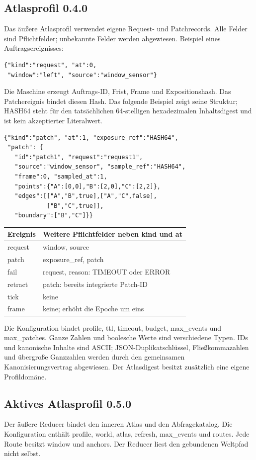 \documentclass[11pt,a4paper]{article}
\begin{document}
\subsection{Atlasprofil 0.4.0}
Das äußere Atlasprofil verwendet eigene Request- und Patchrecords.
Alle Felder sind Pflichtfelder; unbekannte Felder werden abgewiesen.
Beispiel eines Auftragsereignisses:
\begin{lstlisting}
{"kind":"request", "at":0,
 "window":"left", "source":"window_sensor"}
\end{lstlisting}
Die Maschine erzeugt Auftrags-ID, Frist, Frame und Expositionshash.
Das Patchereignis bindet diesen Hash. Das folgende Beispiel zeigt
seine Struktur; HASH64 steht für den tatsächlichen 64-stelligen
hexadezimalen Inhaltsdigest und ist kein akzeptierter Literalwert.
\begin{lstlisting}
{"kind":"patch", "at":1, "exposure_ref":"HASH64",
 "patch": {
   "id":"patch1", "request":"request1",
   "source":"window_sensor", "sample_ref":"HASH64",
   "frame":0, "sampled_at":1,
   "points":{"A":[0,0],"B":[2,0],"C":[2,2]},
   "edges":[["A","B",true],["A","C",false],
            ["B","C",true]],
   "boundary":["B","C"]}}
\end{lstlisting}
\begin{tabularx}{\linewidth}{@{}lY@{}}\toprule
Ereignis & Weitere Pflichtfelder neben kind und at\\\midrule
request & window, source\\
patch & exposure\_ref, patch\\
fail & request, reason: TIMEOUT oder ERROR\\
retract & patch: bereits integrierte Patch-ID\\
tick & keine\\
frame & keine; erhöht die Epoche um eins\\\bottomrule
\end{tabularx}

Die Konfiguration bindet profile, ttl, timeout, budget,
max\_events und max\_patches. Ganze Zahlen und boolesche Werte
sind verschiedene Typen. IDs und kanonische Inhalte sind ASCII;
JSON-Duplikatschlüssel, Fließkommazahlen und übergroße Ganzzahlen
werden durch den gemeinsamen Kanonisierungsvertrag abgewiesen.
Der Atlasdigest besitzt zusätzlich eine eigene Profildomäne.

\clearpage
\subsection{Aktives Atlasprofil 0.5.0}
Der äußere Reducer bindet den inneren Atlas und den Abfragekatalog.
Die Konfiguration enthält profile, world, atlas, refresh, max\_events
und routes. Jede Route besitzt window und anchors. Der Reducer
liest den gebundenen Weltpfad nicht selbst.
\end{document}
